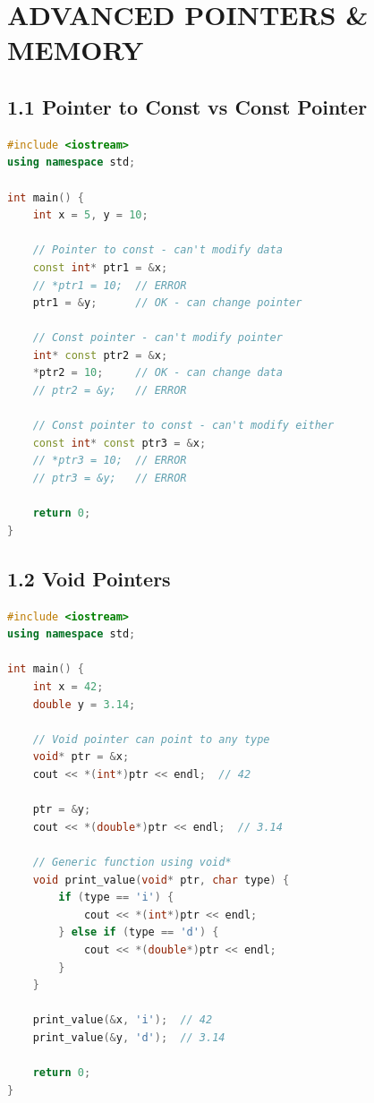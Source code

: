 \hypertarget{advanced-pointers-memory}{%
\chapter{ADVANCED POINTERS \& MEMORY}\label{advanced-pointers-memory}}

\hypertarget{pointer-to-const-vs-const-pointer}{%
\section{1.1 Pointer to Const vs Const
Pointer}\label{pointer-to-const-vs-const-pointer}}

\begin{lstlisting}[language={C++}]
#include <iostream>
using namespace std;

int main() {
    int x = 5, y = 10;
    
    // Pointer to const - can't modify data
    const int* ptr1 = &x;
    // *ptr1 = 10;  // ERROR
    ptr1 = &y;      // OK - can change pointer
    
    // Const pointer - can't modify pointer
    int* const ptr2 = &x;
    *ptr2 = 10;     // OK - can change data
    // ptr2 = &y;   // ERROR
    
    // Const pointer to const - can't modify either
    const int* const ptr3 = &x;
    // *ptr3 = 10;  // ERROR
    // ptr3 = &y;   // ERROR
    
    return 0;
}
\end{lstlisting}

\hypertarget{void-pointers}{%
\section{1.2 Void Pointers}\label{void-pointers}}

\begin{lstlisting}[language={C++}]
#include <iostream>
using namespace std;

int main() {
    int x = 42;
    double y = 3.14;
    
    // Void pointer can point to any type
    void* ptr = &x;
    cout << *(int*)ptr << endl;  // 42
    
    ptr = &y;
    cout << *(double*)ptr << endl;  // 3.14
    
    // Generic function using void*
    void print_value(void* ptr, char type) {
        if (type == 'i') {
            cout << *(int*)ptr << endl;
        } else if (type == 'd') {
            cout << *(double*)ptr << endl;
        }
    }
    
    print_value(&x, 'i');  // 42
    print_value(&y, 'd');  // 3.14
    
    return 0;
}
\end{lstlisting}

